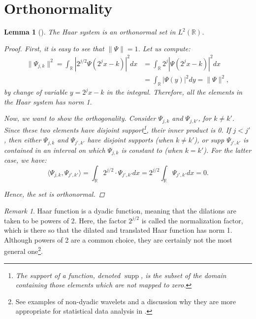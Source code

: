 \documentclass[11pt]{amsart}
\theoremstyle{theorem} %
\newtheorem{lem}[thm]{Lemma} %
\theoremstyle{definition}
\theoremstyle{example}
\theoremstyle{remark}
\newtheorem{rem}[thm]{Remark}
\numberwithin{equation}{section}
\newcommand{\R}{\mathbb{R}}
\DeclareMathOperator*{\supp}{supp}
\begin{document}
\section{Orthonormality} \label{section:orthonormality}
\begin{lem}[{\cite[409]{davidson}}] \label{lem:orthonormal}
	The Haar system is an orthonormal set in $ L^2(\R) $.
	
	\begin{proof}
		First, it is easy to see that $ \| \varPsi \| = 1 $. Let us compute:
		\begin{align*}
		\| \varPsi_{j,k} \|^2 = \int_{\R} \left| 2^{j/2} \varPsi(2^{j} x - k) \right|^2 dx 
		&=   \int_{\R} 2^j \left| \varPsi(2^{j} x - k) \right|^2 dx \\
		&= \int_{\R} \left| \varPsi(y) \right|^2 dy
		= \| \varPsi \|^2,
		\end{align*}
		by change of variable $ y = 2^{j}x-k $ in the integral. Therefore, all the elements in the Haar system has norm 1.
		
		Now, we want to show the orthogonality. Consider $ \varPsi_{j,k} $ and $ \varPsi_{j,k'} $, for $ k \neq k' $. Since these two elements have disjoint support\footnote{The \emph{support} of a function, denoted $ \supp $, is the subset of the domain containing those elements which are not mapped to zero.}, their inner product is 0. If $ j < j' $, then either $ \varPsi_{j,k} $ and $ \varPsi_{j',k'} $ have disjoint supports (when $ k \neq k' $), or supp $ \varPsi_{j',k'} $ is contained in an interval on which $ \varPsi_{j,k} $ is constant to (when $ k = k' $). For the latter case, we have:
		\[ \langle \varPsi_{j,k}, \varPsi_{j',k'} \rangle =  \int_{\R} 2^{j/2} \cdot \varPsi_{j',k'} dx = 2^{j/2} \int_{\R} \varPsi_{j',k'} dx = 0. \]
	
		Hence, the set is orthonormal.
	\end{proof}
\end{lem}

\begin{rem}
	Haar function is a dyadic function, meaning that the dilations are taken to be powers of 2. Here, the factor $ 2^{j/2} $ is called the normalization factor, which is there so that the dilated and translated Haar function has norm 1. Although powers of 2 are a common choice, they are certainly not the most general one\footnote{See examples of non-dyadic wavelets and a discussion why they are more appropriate for statistical data analysis in \cite{pollock}.}.
\end{rem}
\end{document}
